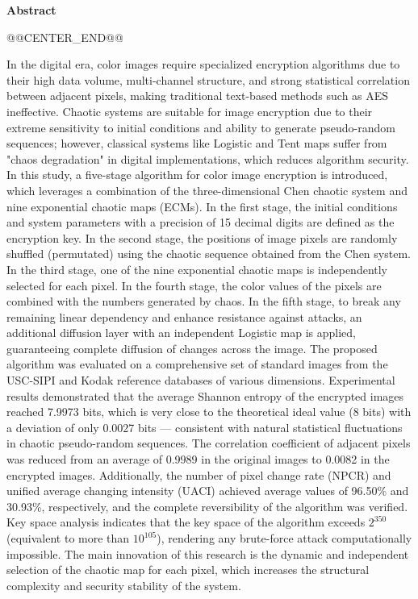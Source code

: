     {\Large \textbf{Abstract}}


@@CENTER_END@@


\vspace{0.5cm}

In the digital era, color images require specialized encryption algorithms due to their high data volume, multi-channel structure, and strong statistical correlation between adjacent pixels, making traditional text-based methods such as AES ineffective. Chaotic systems are suitable for image encryption due to their extreme sensitivity to initial conditions and ability to generate pseudo-random sequences; however, classical systems like Logistic and Tent maps suffer from "chaos degradation" in digital implementations, which reduces algorithm security. In this study, a five-stage algorithm for color image encryption is introduced, which leverages a combination of the three-dimensional Chen chaotic system and nine exponential chaotic maps (ECMs). In the first stage, the initial conditions and system parameters with a precision of 15 decimal digits are defined as the encryption key. In the second stage, the positions of image pixels are randomly shuffled (permutated) using the chaotic sequence obtained from the Chen system. In the third stage, one of the nine exponential chaotic maps is independently selected for each pixel. In the fourth stage, the color values of the pixels are combined with the numbers generated by chaos. In the fifth stage, to break any remaining linear dependency and enhance resistance against attacks, an additional diffusion layer with an independent Logistic map is applied, guaranteeing complete diffusion of changes across the image. The proposed algorithm was evaluated on a comprehensive set of standard images from the USC-SIPI and Kodak reference databases of various dimensions. Experimental results demonstrated that the average Shannon entropy of the encrypted images reached 7.9973 bits, which is very close to the theoretical ideal value (8 bits) with a deviation of only 0.0027 bits — consistent with natural statistical fluctuations in chaotic pseudo-random sequences. The correlation coefficient of adjacent pixels was reduced from an average of 0.9989 in the original images to 0.0082 in the encrypted images. Additionally, the number of pixel change rate (NPCR) and unified average changing intensity (UACI) achieved average values of 96.50\% and 30.93\%, respectively, and the complete reversibility of the algorithm was verified. Key space analysis indicates that the key space of the algorithm exceeds $2^{350}$ (equivalent to more than $10^{105}$), rendering any brute-force attack computationally impossible. The main innovation of this research is the dynamic and independent selection of the chaotic map for each pixel, which increases the structural complexity and security stability of the system.

